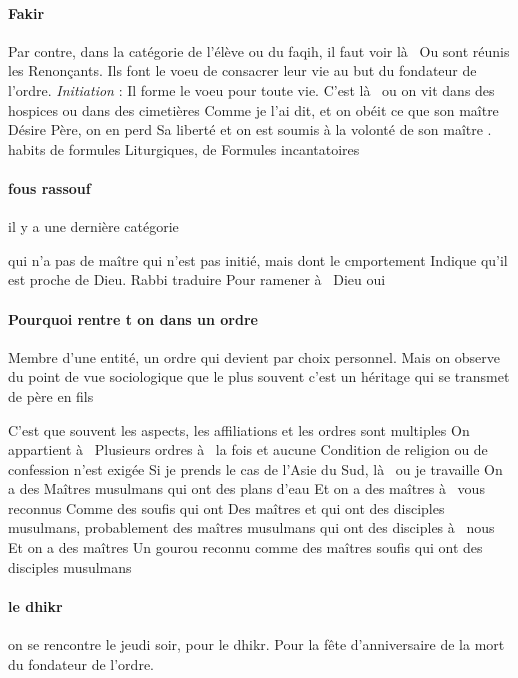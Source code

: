 \paragraph{Fakir}
Par contre, dans la 
catégorie 
de l'élève ou du faqih, il faut voir là  
Ou sont réunis les 
Renonçants. Ils font 
le voeu de consacrer 
leur vie au but du fondateur de l'ordre. \textit{Initiation} :
Il forme le voeu pour toute vie. C'est là  ou on vit dans des hospices ou dans des cimetières  Comme je l'ai dit, et on obéit 
  ce que son maître 
Désire 
Père, on en perd 
Sa liberté et on est soumis 
à  la volonté de son maître   . habits
de formules 
Liturgiques, de 
Formules incantatoires 

\paragraph{fous rassouf} il y a une 
    dernière catégorie 
 
qui  n'a pas de maître 
qui  n'est pas initié, mais dont le 
cmportement 
Indique qu'il est proche 
de Dieu. 
Rabbi traduire 
Pour ramener à  Dieu oui 

\paragraph{Pourquoi rentre t on dans un ordre}
Membre d'une entité, un ordre qui  devient par choix personnel.   Mais on observe du point de vue sociologique que le plus souvent c'est 
un héritage qui  se 
transmet de père en fils 
\begin{Ex}
  C'est que souvent les aspects, les affiliations et les ordres sont multiples  On appartient à  
Plusieurs ordres à  la fois et aucune 
Condition de religion ou de confession n'est exigée 
Si je prends le cas de l'Asie du Sud, là  ou je travaille 
On a des 
Maîtres musulmans 
qui  ont des plans d'eau 
Et on a des maîtres à  vous reconnus 
Comme des soufis qui  ont 
Des maîtres et qui  ont des disciples musulmans, probablement des maîtres musulmans qui  ont des disciples à  nous  Et on a des maîtres 
Un gourou reconnu comme des maîtres soufis qui  ont des disciples musulmans   
\end{Ex} 

\paragraph{le dhikr} on se rencontre le jeudi soir, pour le dhikr.  
Pour la fête d'anniversaire de la mort du fondateur de l'ordre.

